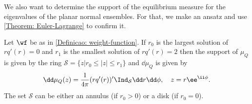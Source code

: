 We also want to determine the support of the equilibrium measure for the eigenvalues of the planar normal ensembles. For that, we make an ansatz and use \autoref{Theorem: Euler-Lagrange} to confirm it.

\begin{teorema}
	Let $\wf$ be as in \autoref{Definicao: weight-function}. If	$r_0$ is the largest solution of $r q'(r) = 0$ and $r_ 1$ is the smallest solution of $r q'(r) = 2$ then the support of $\mu_Q$ is given by the ring $\mathcal{S} = \{z | r_0 \leq |z| \leq r_1\}$ and $\dd \mu_Q$ is given by
	\begin{equation}
		\dd \mu_Q(z) = \frac{1}{4\pi} (r q'(r))' \Ind_{\mathcal{S}} \dd r \dd \phi, \quad z = r \ee^{\ii \phi}.
	\end{equation}
	The set $\mathcal{S}$ can be either an annulus (if $r_0 > 0$) or a disk (if $r_0 = 0$).
\end{teorema}
